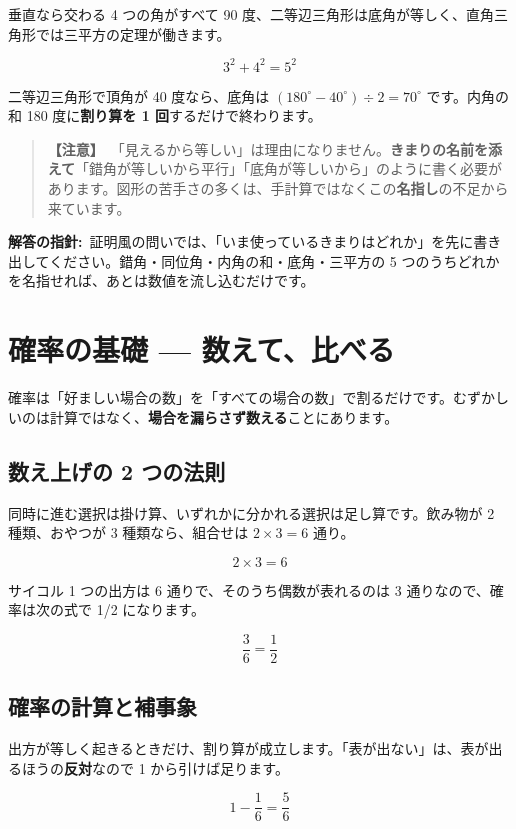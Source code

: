 \documentclass{article}
\begin{document}
垂直なら交わる 4 つの角がすべて 90 度、二等辺三角形は底角が等しく、直角三角形では三平方の定理が働きます。

\[ 3^2 + 4^2 = 5^2 \]

二等辺三角形で頂角が 40 度なら、底角は \((180^{\circ} - 40^{\circ}) \div 2 = 70^{\circ}\) です。内角の和 180 度に\textbf{割り算を 1 回}するだけで終わります。

\begin{quote}
\textbf{【注意】}\ 「見えるから等しい」は理由になりません。\textbf{きまりの名前を添えて}「錯角が等しいから平行」「底角が等しいから」のように書く必要があります。図形の苦手さの多くは、手計算ではなくこの\textbf{名指し}の不足から来ています。
\end{quote}

\textbf{解答の指針:}\ 証明風の問いでは、「いま使っているきまりはどれか」を先に書き出してください。錯角・同位角・内角の和・底角・三平方の 5 つのうちどれかを名指せれば、あとは数値を流し込むだけです。

\section{確率の基礎 — 数えて、比べる}

確率は「好ましい場合の数」を「すべての場合の数」で割るだけです。むずかしいのは計算ではなく、\textbf{場合を漏らさず数える}ことにあります。

\subsection{数え上げの 2 つの法則}

同時に進む選択は掛け算、いずれかに分かれる選択は足し算です。飲み物が 2 種類、おやつが 3 種類なら、組合せは \(2 \times 3 = 6\) 通り。

\[ 2 \times 3 = 6 \]

サイコル 1 つの出方は 6 通りで、そのうち偶数が表れるのは 3 通りなので、確率は次の式で 1/2 になります。

\[ \frac{3}{6} = \frac{1}{2} \]

\subsection{確率の計算と補事象}

出方が等しく起きるときだけ、割り算が成立します。「表が出ない」は、表が出るほうの\textbf{反対}なので 1 から引けば足ります。

\[ 1 - \frac{1}{6} = \frac{5}{6} \]
\end{document}
